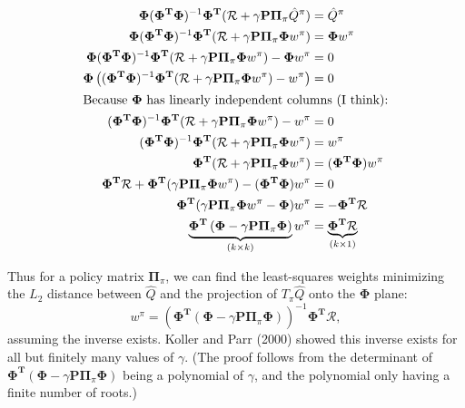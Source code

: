 \documentclass{article}
\newcommand{\parens}[1]{\left(#1\right)}
\begin{document}
\begin{align*}
	\mathbf{\Phi}(\mathbf{\Phi}^{\mathbf{T}}\mathbf{\Phi})^{-1}\mathbf{\Phi}^{\mathbf{T}}
		(\mathcal{R}+\gamma \mathbf{P}\mathbf{\Pi}_{\pi}\hat{Q}^{\pi})&=\hat{Q}^{\pi}\\	\mathbf{\Phi}(\mathbf{\Phi}^{\mathbf{T}}\mathbf{\Phi})^{-1}\mathbf{\Phi}^{\mathbf{T}}
				(\mathcal{R}+\gamma \mathbf{P}\mathbf{\Pi}_{\pi}\mathbf{\Phi}w^{\pi})&=\mathbf{\Phi}w^{\pi}\\
		\mathbf{\Phi}(\mathbf{\Phi}^{\mathbf{T}}\mathbf{\Phi})^{-1}\mathbf{\Phi}^{\mathbf{T}}
				(\mathcal{R}+\gamma \mathbf{P}\mathbf{\Pi}_{\pi}\mathbf{\Phi}w^{\pi})-\mathbf{\Phi}w^{\pi}&=0\\
		\mathbf{\Phi}\parens{(\mathbf{\Phi}^{\mathbf{T}}\mathbf{\Phi})^{-1}\mathbf{\Phi}^{\mathbf{T}}
						(\mathcal{R}+\gamma \mathbf{P}\mathbf{\Pi}_{\pi}\mathbf{\Phi}w^{\pi})-w^{\pi}}&=0\\
		\shortintertext{Because $\mathbf{\Phi}$ has linearly independent columns (I think):}
		(\mathbf{\Phi}^{\mathbf{T}}\mathbf{\Phi})^{-1}\mathbf{\Phi}^{\mathbf{T}}
						(\mathcal{R}+\gamma \mathbf{P}\mathbf{\Pi}_{\pi}\mathbf{\Phi}w^{\pi})-w^{\pi}&=0\\
		(\mathbf{\Phi}^{\mathbf{T}}\mathbf{\Phi})^{-1}\mathbf{\Phi}^{\mathbf{T}}
						(\mathcal{R}+\gamma \mathbf{P}\mathbf{\Pi}_{\pi}\mathbf{\Phi}w^{\pi})&=w^{\pi}\\
		\mathbf{\Phi}^{\mathbf{T}}(\mathcal{R}+\gamma \mathbf{P}\mathbf{\Pi}_{\pi}\mathbf{\Phi}w^{\pi})&=(\mathbf{\Phi}^{\mathbf{T}}\mathbf{\Phi})w^{\pi}\\
		\mathbf{\Phi}^{\mathbf{T}}\mathcal{R}+\mathbf{\Phi}^{\mathbf{T}}(\gamma \mathbf{P}\mathbf{\Pi}_{\pi}\mathbf{\Phi}w^{\pi})-(\mathbf{\Phi}^{\mathbf{T}}\mathbf{\Phi})w^{\pi}&=0\\
		\mathbf{\Phi}^{\mathbf{T}}(\gamma \mathbf{P}\mathbf{\Pi}_{\pi}\mathbf{\Phi}w^{\pi}-\mathbf{\Phi})w^{\pi}&=
			-\mathbf{\Phi}^{\mathbf{T}}\mathcal{R}\\
		\underbrace{\mathbf{\Phi}^{\mathbf{T}}\parens{\mathbf{\Phi}-\gamma \mathbf{P}\mathbf{\Pi}_{\pi}\mathbf{\Phi}}
		}_{(k\times k)}
		w^{\pi}&=
		\underbrace{\mathbf{\Phi}^{\mathbf{T}}\mathcal{R}}_{(k\times 1)}\\
		\end{align*}

Thus for a policy matrix $\mathbf{\Pi}_{\pi}$, we can find the least-squares weights minimizing the $L_{2}$ distance between $\hat{Q}$ and the projection of  $T_{\pi}\hat{Q}$ onto the $\mathbf{\Phi}$ plane:
\[
	w^{\pi}=\parens{\mathbf{\Phi}^{\mathbf{T}}\parens{\mathbf{\Phi}-\gamma \mathbf{P}\mathbf{\Pi}_{\pi}\mathbf{\Phi}}}^{-1}\mathbf{\Phi}^{\mathbf{T}}\mathcal{R},
\]
assuming the inverse exists. 
Koller and Parr (2000) showed this inverse exists for all but finitely many values of $\gamma$. (The proof follows from the determinant of $	\mathbf{\Phi}^{\mathbf{T}}\parens{\mathbf{\Phi}-\gamma \mathbf{P}\mathbf{\Pi}_{\pi}\mathbf{\Phi}}$ being a polynomial of $\gamma$, and the polynomial only having a finite number of roots.)
\end{document}
